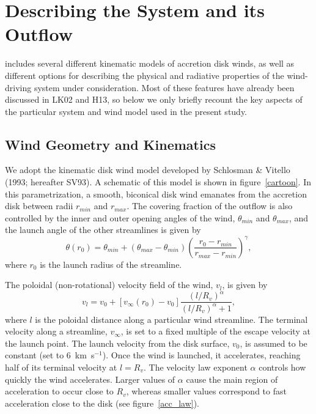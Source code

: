 \documentclass[preprint, a4paper, 11pt]{aastex}
\begin{document}
\nocite{osterbrock}
\nocite{seaton1959}

%
%

\section{Describing the System and its Outflow}

\py includes several different kinematic models of accretion disk
winds, as well as different options for describing the physical and
radiative properties of the wind-driving system under
consideration. Most of these features have already been discussed in
LK02 and H13, so below we only briefly recount the key aspects of the
particular system and wind model used in the present study.

\subsection{Wind Geometry and Kinematics}
\label{kinematics}

We adopt the kinematic disk wind model developed by Schlosman \&
Vitello (1993; hereafter SV93). A schematic of this model is shown in
figure~\ref{cartoon}. In this parametrization, a smooth, biconical
disk wind emanates from the accretion disk between radii $r_{min}$ and 
$r_{max}$. The covering fraction of the outflow is also controlled by the
inner and outer opening angles of the wind, $\theta_{min}$ and
$\theta_{max}$, and the launch angle of the other streamlines is given
by 
\begin{equation}
\theta(r_0) = \theta_{min} + (\theta_{max} - \theta_{min}) \left(\frac{r_0 - r_{min}}{r_{max} - r_{min}} \right)^{\gamma},
\label{theta}
\end{equation}
where $r_0$ is the launch radius of the streamline.

The poloidal (non-rotational) velocity field of the wind, $v_l$, is given by
\begin{equation}
v_l=v_0+\left[v_{\infty}(r_0)-v_0\right]\frac{\left(l/R_v\right)^{\alpha}}{\left(l/R_v\right)^{\alpha}+1},
\label{v_law}
\end{equation}
where $l$ is the poloidal distance along a particular wind
streamline. The terminal velocity along a streamline, $v_{\infty}$, is
set to a fixed multiple of the escape velocity at the launch
point. The launch velocity from the disk surface, $v_0$, is assumed to
be constant (set to $6$~km~s$^{-1}$). Once the wind is launched, it
accelerates, reaching half of its terminal velocity at $l = R_v$. The
velocity law exponent $\alpha$ controls how quickly the wind
accelerates. Larger values of $\alpha$ cause the main region of 
acceleration to occur close to $R_v$, whereas smaller values
correspond to fast acceleration close to the disk (see
figure~\ref{acc_law}). 
\end{document}
